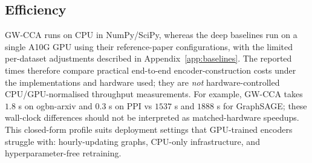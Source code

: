 \documentclass{article}
\begin{document}
\begin{table}[t]
\caption{End-to-end encoder construction time (seconds; mean $\pm$ std over 5 seeds for deep baselines, single value for deterministic methods). GW-CCA and CCA$^\ast$ run on CPU (no GPU); deep baselines run on a single A10G GPU.}
\label{tab:efficiency}
\centering
\renewcommand{\arraystretch}{0.9}%
\end{table}

\subsection{Efficiency}
GW-CCA runs on CPU in NumPy/SciPy, whereas the deep baselines run on a
single A10G GPU using their reference-paper configurations,
with the limited per-dataset adjustments described in
Appendix~\ref{app:baselines}. The reported times
therefore compare practical end-to-end encoder-construction costs under
the implementations and hardware used; they are \emph{not}
hardware-controlled CPU/GPU-normalised throughput measurements. For
example, GW-CCA takes $1.8$ s on ogbn-arxiv and $0.3$ s on PPI vs
$1537$ s and $1888$ s for GraphSAGE; these wall-clock differences should
not be interpreted as matched-hardware speedups. This closed-form
profile suits deployment settings that GPU-trained encoders struggle
with: hourly-updating graphs, CPU-only infrastructure, and
hyperparameter-free retraining.
\end{document}

